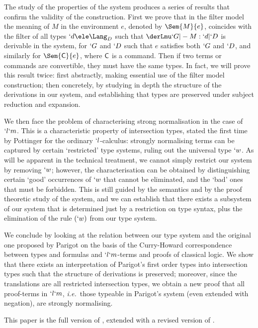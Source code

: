 \documentclass{CSML}
\def\ie{\emph{i.e.}}
\begin{document}
The study of the properties of the system produces a series of results that confirm the validity of the construction. 
First we prove that in the filter model the meaning of $M$ in the environment $e$, denoted by $\Sem{ M }{ e }$, coincides with the filter of all types $`d\ele \Lang_D$ such that $ \derLmu `G |- M : `d | `D $ is derivable in the system, for $`G$ and $`D $ such that $e$ satisfies both $`G$ and $`D $, and similarly for $\Sem{\Cmd}{ e }$, where $\textrm{\sf C}$ is a command. 
Then if two terms or commands are convertible, they must have the same types. 
In fact, we will prove this result twice: first abstractly, making essential use of the filter model construction; then concretely, by studying in depth the structure of the derivations in our system, and establishing that types are preserved under subject reduction and expansion.

We then face the problem of characterising strong normalisation in the case of $`l`m$. 
This is a characteristic property of intersection types, stated the first time by Pottinger \cite{Pottinger'80} for the ordinary $`l$-calculus: strongly normalising terms can be captured by certain `restricted' type systems, ruling out the universal type $`w$.
As will be apparent in the technical treatment, we cannot simply restrict our system by removing $`w$; however, the characterisation can be obtained by distinguishing certain `good' occurrences of $`w$ that cannot be eliminated, and the `bad' ones that must be forbidden. 
This is still guided by the semantics and by the proof theoretic study
of the system, and we can establish that there exists a subsystem of
our system that is determined just by a restriction on type syntax,
plus the elimination of the rule $(`w)$ from our type system.
\enlargethispage{1.1\baselineskip}

We conclude by looking at the relation between our type system and the original one proposed by Parigot \cite{Parigot'92} on the basis of the Curry-Howard correspondence between types and formulas and $`l`m$-terms and proofs of classical logic. 
We show that there exists an interpretation of Parigot's first order types into intersection types such that the structure of derivations is preserved; moreover, since the translations are all restricted intersection types, we obtain a new proof that all proof-terms in $`l`m$, \ie~those typeable in Parigot's system (even extended with negation), are strongly normalising. 

This paper is the full version of \cite{Bakel-Barbanera-deLiguoro-TLCA'11}, extended with a revised version of \cite{BakBdL-ITRS12}.
\end{document}
